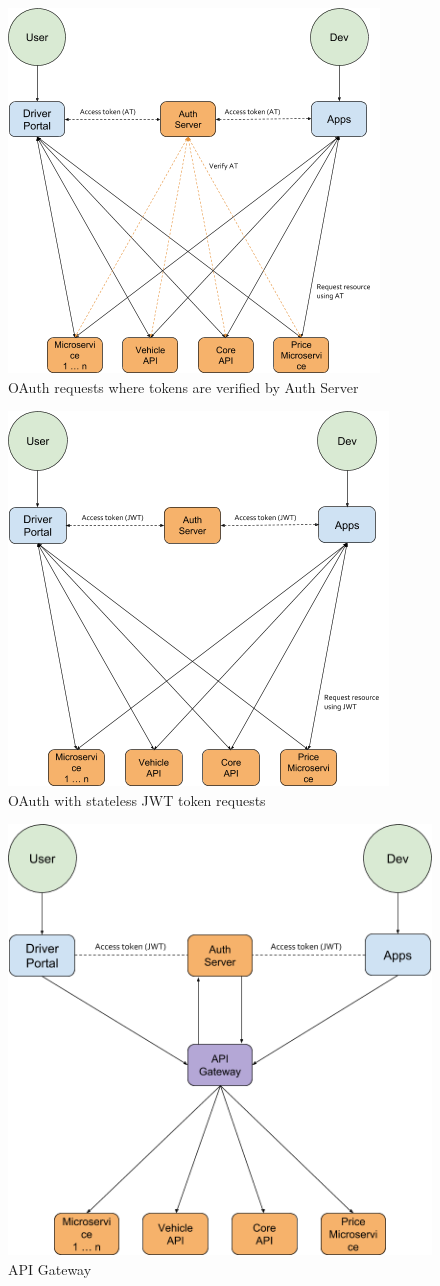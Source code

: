 \begin{figure}[ht!]
	\centering
	\includegraphics[width=.7\textwidth]{Auth1}
	\caption[Architecture]{OAuth requests where tokens are verified by Auth Server}
	\label{fig:Auth1}
\end{figure}
\clearpage
\begin{figure}[ht!]
	\centering
	\includegraphics[width=.7\textwidth]{Auth2}
	\caption[Architecture]{OAuth with stateless JWT token requests}
	\label{fig:Auth2}
\end{figure}
\clearpage
\begin{figure}[ht!]
	\centering
	\includegraphics[width=.7\textwidth]{Auth3}
	\caption[Architecture]{API Gateway}
	\label{fig:Auth3}
\end{figure}
